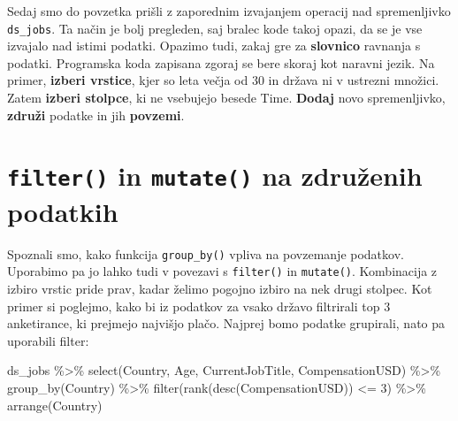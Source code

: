 \documentclass[
]{book}
\newenvironment{Shaded}{\begin{snugshade}}{\end{snugshade}}
\newcommand{\DecValTok}[1]{\textcolor[rgb]{0.00,0.00,0.81}{#1}}
\newcommand{\FunctionTok}[1]{\textcolor[rgb]{0.00,0.00,0.00}{#1}}
\newcommand{\NormalTok}[1]{#1}
\newcommand{\SpecialCharTok}[1]{\textcolor[rgb]{0.00,0.00,0.00}{#1}}
\begin{document}
Sedaj smo do povzetka prišli z zaporednim izvajanjem operacij nad spremenljivko \texttt{ds\_jobs}. Ta način je bolj pregleden, saj bralec kode takoj opazi, da se je vse izvajalo nad istimi podatki. Opazimo tudi, zakaj gre za \textbf{slovnico} ravnanja s podatki. Programska koda zapisana zgoraj se bere skoraj kot naravni jezik. Na primer, \textbf{izberi vrstice}, kjer so leta večja od 30 in država ni v ustrezni množici. Zatem \textbf{izberi stolpce}, ki ne vsebujejo besede Time. \textbf{Dodaj} novo spremenljivko, \textbf{združi} podatke in jih \textbf{povzemi}.

\hypertarget{filter-in-mutate-na-zdruux17eenih-podatkih}{%
\section{\texorpdfstring{\texttt{filter()} in \texttt{mutate()} na združenih podatkih}{filter() in mutate() na združenih podatkih}}\label{filter-in-mutate-na-zdruux17eenih-podatkih}}

Spoznali smo, kako funkcija \texttt{group\_by()} vpliva na povzemanje podatkov. Uporabimo pa jo lahko tudi v povezavi s \texttt{filter()} in \texttt{mutate()}. Kombinacija z izbiro vrstic pride prav, kadar želimo pogojno izbiro na nek drugi stolpec. Kot primer si poglejmo, kako bi iz podatkov za vsako državo filtrirali top 3 anketirance, ki prejmejo najvišjo plačo. Najprej bomo podatke grupirali, nato pa uporabili filter:

\begin{Shaded}
\begin{Highlighting}[]
\NormalTok{ds\_jobs }\SpecialCharTok{\%\textgreater{}\%}
  \FunctionTok{select}\NormalTok{(Country, Age, CurrentJobTitle, CompensationUSD) }\SpecialCharTok{\%\textgreater{}\%}
  \FunctionTok{group\_by}\NormalTok{(Country) }\SpecialCharTok{\%\textgreater{}\%}
  \FunctionTok{filter}\NormalTok{(}\FunctionTok{rank}\NormalTok{(}\FunctionTok{desc}\NormalTok{(CompensationUSD)) }\SpecialCharTok{\textless{}=} \DecValTok{3}\NormalTok{) }\SpecialCharTok{\%\textgreater{}\%}
  \FunctionTok{arrange}\NormalTok{(Country)}
\end{Highlighting}
\end{Shaded}
\end{document}
